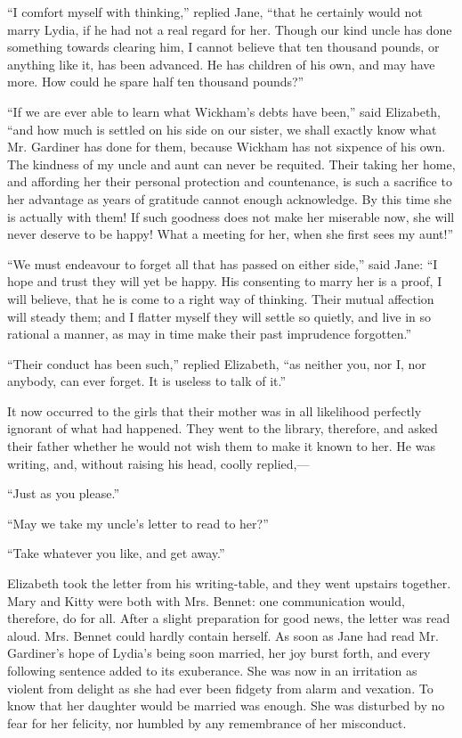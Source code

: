 \documentclass[10pt]{book}
\begin{document}
   “I comfort myself with thinking,” replied Jane, “that he certainly would
not marry Lydia, if he had not a real regard for her. Though our kind
uncle has done something towards clearing him, I cannot believe that ten
thousand pounds, or anything like it, has been advanced. He has children
of his own, and may have more. How could he spare half ten thousand
pounds?”
  

   “If we are ever able to learn what Wickham’s debts have been,” said
Elizabeth, “and how much is settled on his side on our sister, we shall
exactly know what Mr. Gardiner has done for them, because Wickham has
not sixpence of his own. The kindness of my uncle and aunt can never be
requited. Their taking her home, and affording
   her their personal
protection and countenance, is such a sacrifice to her advantage as
years of gratitude cannot enough acknowledge. By this time she is
actually with them! If such goodness does not make her miserable now,
she will never deserve to be happy! What a meeting for her, when she
first sees my aunt!”
  

   “We must endeavour to forget all that has passed on either side,” said
Jane: “I hope and trust they will yet be happy. His consenting to marry
her is a proof, I will believe, that he is come to a right way of
thinking. Their mutual affection will steady them; and I flatter myself
they will settle so quietly, and live in so rational a manner, as may in
time make their past imprudence forgotten.”
  

   “Their conduct has been such,” replied Elizabeth, “as neither you, nor
I, nor anybody, can ever forget. It is useless to talk of it.”
  

   It now occurred to the girls that their mother was in all likelihood
perfectly ignorant of what had happened. They went to the library,
therefore, and asked their father whether he would not wish them to make
it known to her. He was writing, and, without raising his head, coolly
replied,—
  

   “Just as you please.”
  

   “May we take my uncle’s letter to read to her?”
  

   “Take whatever you like, and get away.”
  

   Elizabeth took the letter from his writing-table, and they went upstairs
together. Mary and Kitty were both with Mrs. Bennet: one communication
would, therefore, do for all. After a slight preparation for good news,
the letter was read aloud. Mrs. Bennet could hardly contain herself. As
soon as Jane had read Mr. Gardiner’s hope of Lydia’s being soon married,
her joy burst forth, and every following sentence added to its
exuberance. She
   was now in an irritation as violent from delight as she
had ever been fidgety from alarm and vexation. To know that her daughter
would be married was enough. She was disturbed by no fear for her
felicity, nor humbled by any remembrance of her misconduct.
  
\end{document}
